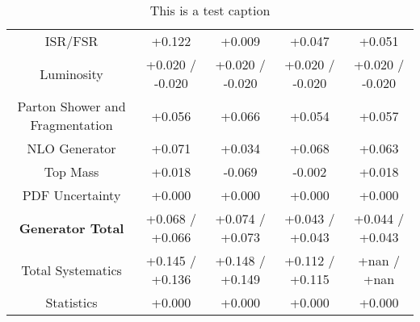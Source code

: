 \begin{table}[htbp]
\begin{center}
\begin{tabular}{|c|c|c|c|c|}
ISR/FSR                               &+0.122              & +0.009              & +0.047              & +0.051             \\
Luminosity                            &+0.020   / -0.020   & +0.020   / -0.020   & +0.020   / -0.020   & +0.020   / -0.020  \\
Parton Shower and Fragmentation       &+0.056              & +0.066              & +0.054              & +0.057             \\
NLO Generator                         &+0.071              & +0.034              & +0.068              & +0.063             \\
Top Mass                              &+0.018              & -0.069              & -0.002              & +0.018             \\
PDF Uncertainty                       &+0.000              & +0.000              & +0.000              & +0.000             \\
\hline
\textbf{Generator Total}              &+0.068   / +0.066   & +0.074   / +0.073   & +0.043   / +0.043   & +0.044   / +0.043  \\
\hline
\hline
Total Systematics                     &+0.145   / +0.136   & +0.148   / +0.149   & +0.112   / +0.115   & +nan     / +nan    \\
Statistics                            &+0.000              & +0.000              & +0.000              & +0.000             \\
\hline
  \end{tabular}
  \end{center} 
  \label{tab:xsec_nominal_sratio_high}
  \caption{This is a test caption}
\end{table}
 
